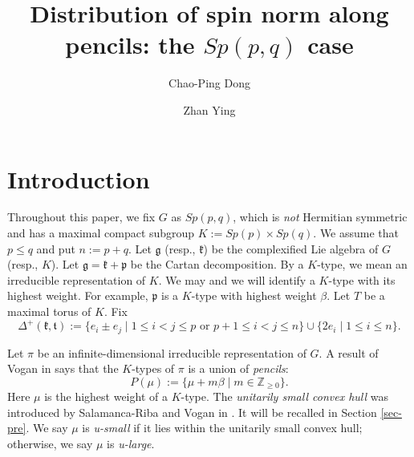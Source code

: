 \documentclass[11pt]{amsart}
\theoremstyle{plain}
\theoremstyle{definition}
\newcommand{\frg}{\mathfrak{g}}
\newcommand{\frk}{\mathfrak{k}}
\newcommand{\frp}{\mathfrak{p}}
\newcommand{\frt}{\mathfrak{t}}
\newcommand{\bbZ}{\mathbb{Z}}
\begin{document}
\title[Distribution of spin norm along pencils]
{Distribution of spin norm along pencils: the $Sp(p, q)$ case}

\author{Chao-Ping Dong}
\address[Dong]{School of Mathematical Sciences, Soochow University, Suzhou 215006,
P.~R.~China}

\author{Zhan Ying}
\address[Ying]{School of Mathematical Sciences, Soochow University, Suzhou 215006,
P.~R.~China}








\endabstract





\maketitle


\section{Introduction}
Throughout this paper, we fix $G$ as $Sp(p, q)$, which is \emph{not} Hermitian symmetric and has a maximal compact subgroup $K:=Sp(p)\times  Sp(q)$.  We assume that $p\leq q$ and put $n:=p+q$. Let $\frg$ (resp., $\frk$) be the complexified Lie algebra of $G$ (resp., $K$). Let $\frg=\frk+\frp$ be the Cartan decomposition. By a $K$-type, we mean an irreducible representation of $K$.
We may and we will identify a $K$-type with its highest weight. For example, $\frp$ is a $K$-type with highest weight $\beta$. Let $T$ be a maximal torus of $K$. Fix
\begin{equation}\label{k-posroots}
\Delta^+(\frk, \frt):=\{e_i\pm e_j\mid 1\leq i<j\leq p \mbox{ or } p+1\leq i<j\leq n\}\cup
\{2e_i\mid 1\leq i\leq n\}.
\end{equation}

Let $\pi$ be an infinite-dimensional irreducible representation of $G$.
A result of Vogan in \cite{V80} says that the $K$-types of $\pi$ is a union of \emph{pencils}:
\begin{equation}\label{pencil}
P(\mu):=\{\mu+ m\beta \mid m\in \bbZ_{\geq 0}\}.
\end{equation}
Here $\mu$ is the highest weight of a $K$-type. The \emph{unitarily small convex hull} was introduced by Salamanca-Riba and Vogan in \cite{SV}. It will be recalled in Section \ref{sec-pre}. We say $\mu$ is \emph{u-small} if it lies within the unitarily small convex hull; otherwise, we say $\mu$ is \emph{u-large}.
\end{document}
